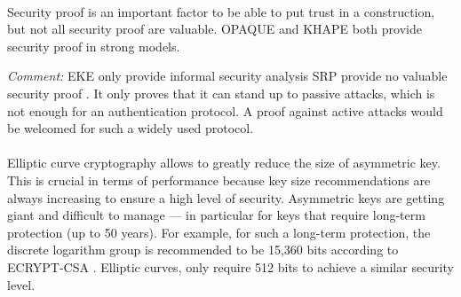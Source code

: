 ﻿\documentclass[../report.tex]{subfiles}
\begin{document}
\paragraph{}
Security proof is an important factor to be able to put trust in a construction, but not all security proof are valuable.
OPAQUE and KHAPE both provide security proof in strong models.

\emph{Comment:} EKE only provide informal security analysis \cite{EKE_Informal_Security_Analysis}
SRP provide no valuable security proof \cite{CAA, SRP_Green_blog}. It only proves that it can stand up to passive attacks, which is not enough for an authentication protocol. A proof against active attacks would be welcomed for such a widely used protocol.


\paragraph{} \label{sec:ecc_comparison}
Elliptic curve cryptography allows to greatly reduce the size of asymmetric key.
This is crucial in terms of performance because key size recommendations are always increasing to ensure a high level of security. Asymmetric keys are getting giant and difficult to manage --- in particular for keys that require long-term protection (up to 50 years). For example, for such a long-term protection, the discrete logarithm group is recommended to be 15,360 bits according to ECRYPT-CSA \cite{ECRYPT_Keylength}.
Elliptic curves, only require 512 bits to achieve a similar security level.
\end{document}
